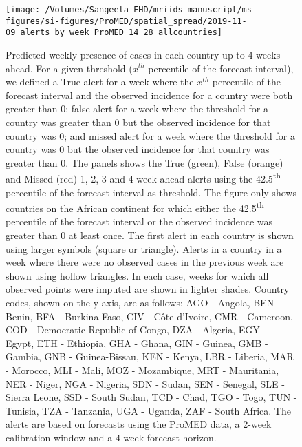 \documentclass[9pt,twoside,lineno]{pnas-new}
\begin{document}
\begin{figure}
\centering
\texttt{[image: /Volumes/Sangeeta EHD/mriids\_manuscript/ms-figures/si-figures/ProMED/spatial\_spread/2019-11-09\_alerts\_by\_week\_ProMED\_14\_28\_allcountries]}
\caption{Predicted weekly presence of cases in
each country up to 4 weeks ahead. For a given threshold (\(x^{th}\)
percentile of the forecast interval), we defined a True alert for a week
where the \(x^{th}\) percentile of the forecast interval and the
observed incidence for a country were both greater than 0; false alert
for a week where the threshold for a country was greater than 0 but the
observed incidence for that country was 0; and missed alert for a week where
the threshold for a country was 0 but the observed incidence for that
country was greater than 0. The panels shows the True (green), False (orange) and
Missed (red) 1, 2, 3 and 4 week ahead alerts using the 
42.5\textsuperscript{th} percentile of the forecast interval as threshold. 
The figure only shows countries on the
African continent for which either the 42.5\textsuperscript{th}
percentile of the forecast interval or the
observed incidence was greater than 0 at least once. 
The first alert in each country is shown
using larger symbols (square or triangle). Alerts in a country in a
week where there were no observed cases in the previous week are shown
using hollow triangles. In each case, weeks for which all observed points
were imputed are shown in lighter shades.
Country codes, shown on the y-axis, are as
follows: AGO - Angola, BEN - Benin, BFA - Burkina Faso, CIV - Côte
d'Ivoire, CMR - Cameroon, COD - Democratic Republic of Congo, DZA -
Algeria, EGY - Egypt, ETH - Ethiopia, 
GHA - Ghana, GIN - Guinea, GMB - Gambia, GNB - Guinea-Bissau, 
KEN - Kenya, LBR - Liberia, MAR - Morocco, 
MLI - Mali,
MOZ - Mozambique,
MRT - Mauritania,
NER - Niger,
NGA - Nigeria,
SDN - Sudan,
SEN - Senegal,
SLE - Sierra Leone,
SSD - South Sudan,
TCD - Chad,
TGO - Togo,
TUN - Tunisia,
TZA - Tanzania,
UGA - Uganda,
ZAF - South Africa. The alerts are based on forecasts 
using the ProMED data, a 2-week calibration window and a 4 week
forecast horizon.}
\label{fig:alerts4weekahead}
\end{figure}\FloatBarrier
\end{document}

